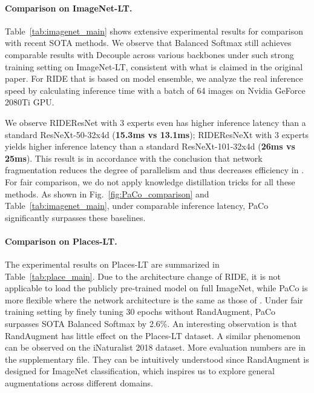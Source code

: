 \documentclass[10pt,twocolumn,letterpaper]{article}
\begin{document}
\paragraph{Comparison on ImageNet-LT.}
Table~\ref{tab:imagenet_main} shows extensive experimental results for comparison with recent SOTA methods. We observe that Balanced Softmax \cite{DBLP:conf/nips/RenYSMZYL20} still achieves comparable results with Decouple \cite{DBLP:conf/iclr/KangXRYGFK20} across various backbones under such strong training setting on ImageNet-LT, consistent with what is claimed in the original paper. For RIDE that is based on model ensemble, we analyze the real inference speed by calculating inference time with a batch of 64 images on Nvidia GeForce 2080Ti GPU. 

We observe RIDEResNet with 3 experts even has higher inference latency than a standard ResNeXt-50-32x4d (\textbf{15.3ms vs 13.1ms}); RIDEResNeXt with 3 experts yields higher inference latency than a standard ResNeXt-101-32x4d (\textbf{26ms vs 25ms}). This result is in accordance with the conclusion that network fragmentation reduces the degree of parallelism and thus decreases efficiency in \cite{DBLP:conf/eccv/MaZZS18, DBLP:conf/iccv/CuiCLLSJ19}. For fair comparison, we do not apply knowledge distillation tricks for all these methods. As shown in Fig.~\ref{fig:PaCo_comparison} and Table~\ref{tab:imagenet_main}, under comparable inference latency, PaCo significantly surpasses these baselines. 

\paragraph{Comparison on Places-LT.}
The experimental results on Places-LT are summarized in Table~\ref{tab:place_main}. Due to the architecture change of RIDE, it is not applicable to load the publicly pre-trained model on full ImageNet, while PaCo is more flexible where the network architecture is the same as those of \cite{Liu_2019_CVPR, DBLP:journals/corr/abs-2101-10633}. Under fair training setting by finely tuning 30 epochs without RandAugment, PaCo surpasses SOTA Balanced Softmax by 2.6\%. An interesting observation is that RandAugment has little effect on the Places-LT dataset. A similar phenomenon can be observed on the iNaturalist 2018 dataset. More evaluation numbers are in the supplementary file. They can be intuitively understood since RandAugment is designed for ImageNet classification, which inspires us to explore general augmentations across different domains.
\end{document}
